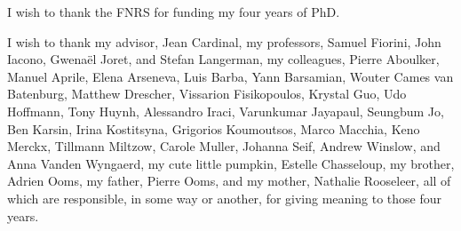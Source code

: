 
I wish to thank the FNRS for funding my four years of PhD.

I wish to thank
%
my advisor,
Jean Cardinal,
%
my professors,
Samuel Fiorini,
John Iacono,
Gwenaël Joret,
and
Stefan Langerman,
%
my colleagues,
Pierre Aboulker,
Manuel Aprile,
Elena Arseneva,
Luis Barba,
Yann Barsamian,
Wouter Cames van Batenburg,
Matthew Drescher,
Vissarion Fisikopoulos,
Krystal Guo,
Udo Hoffmann,
Tony Huynh,
Alessandro Iraci,
Varunkumar Jayapaul,
Seungbum Jo,
Ben Karsin,
Irina Kostitsyna,
Grigorios Koumoutsos,
Marco Macchia,
Keno Merckx,
Tillmann Miltzow,
Carole Muller,
Johanna Seif,
Andrew Winslow,
and
Anna Vanden Wyngaerd,
%
my cute little pumpkin, Estelle Chasseloup,
%
my brother, Adrien Ooms,
my father, Pierre Ooms,
and
my mother, Nathalie Rooseleer,
%
all of which are responsible, in some way or another, for giving meaning to
those four years.
